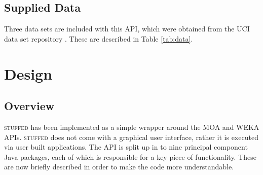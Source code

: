 \documentclass[twoside,a4paper]{refart}
\begin{document}
\subsection{Supplied Data}
Three data sets are included with this API, which were obtained from the UCI data set repository \cite{Lichman:2013}. These are described in Table \ref{tab:data}.
\begin{table}[htp]
\center
\tabcolsep=0.11cm
\caption[]{Characteristics of the data sets provided. }
\label{tab:data}
\end{table}

\section{Design}
\subsection{Overview}
\textsc{stuffed} has been implemented as a simple wrapper around the MOA and WEKA APIs. \textsc{stuffed} does not come with a graphical user interface, rather it is executed via user built applications. The API is split up in to nine principal component Java packages, each of which is responsible for a key piece of functionality. These are now briefly described in order to make the code more understandable.
\end{document}
